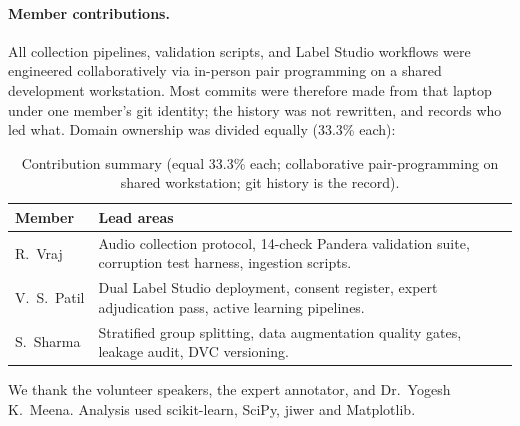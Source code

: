 \documentclass[sigconf,authordraft]{acmart}
\begin{document}
\paragraph{Member contributions.}
All collection pipelines, validation scripts, and Label Studio workflows were engineered collaboratively via in-person pair programming on a shared development workstation. Most commits were therefore made from that laptop under one member's git identity; the history was not rewritten, and  records who led what. Domain ownership was divided equally (33.3\% each):
\begin{table}[htbp]
\caption{Contribution summary (equal 33.3\% each; collaborative pair-programming on shared workstation; git history is the record).}\label{tab:contrib}
\begin{tabular}{p{1.2cm}p{5.8cm}}
\toprule Member & Lead areas \\ \midrule
R.\ Vraj & Audio collection protocol, 14-check Pandera validation suite, corruption test harness, ingestion scripts. \\ V.\ S.\ Patil & Dual Label Studio deployment, consent register, expert adjudication pass, active learning pipelines. \\ S.\ Sharma & Stratified group splitting, data augmentation quality gates, leakage audit, DVC versioning. \\ \bottomrule
\end{tabular}
\end{table}
\begin{acks}
We thank the volunteer speakers, the expert annotator, and Dr.\ Yogesh K.\ Meena. Analysis used scikit-learn, SciPy, jiwer and Matplotlib.
\end{acks}



\appendix
\end{document}
